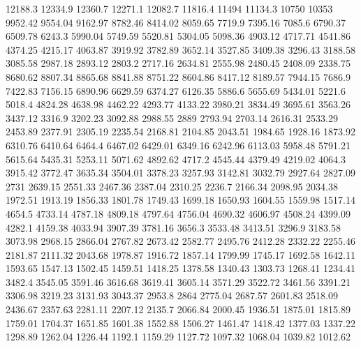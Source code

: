 12188.3      12334.9      12360.7      12271.1      12082.7      11816.4      11494      11134.3      10750      10353      9952.42      9554.04      9162.97      8782.46      8414.02      8059.65      7719.9      7395.16      7085.6      6790.37      6509.78      6243.3      5990.04      5749.59      5520.81      5304.05      5098.36      4903.12      4717.71      4541.86      4374.25      4215.17      4063.87      3919.92      3782.89      3652.14      3527.85      3409.38      3296.43      3188.58      3085.58      2987.18      2893.12      2803.2      2717.16      2634.81      2555.98      2480.45      2408.09      2338.75      
8680.62      8807.34      8865.68      8841.88      8751.22      8604.86      8417.12      8189.57      7944.15      7686.9      7422.83      7156.15      6890.96      6629.59      6374.27      6126.35      5886.6      5655.69      5434.01      5221.6      5018.4      4824.28      4638.98      4462.22      4293.77      4133.22      3980.21      3834.49      3695.61      3563.26      3437.12      3316.9      3202.23      3092.88      2988.55      2889      2793.94      2703.14      2616.31      2533.29      2453.89      2377.91      2305.19      2235.54      2168.81      2104.85      2043.51      1984.65      1928.16      1873.92      
6310.76      6410.64      6464.4      6467.02      6429.01      6349.16      6242.96      6113.03      5958.48      5791.21      5615.64      5435.31      5253.11      5071.62      4892.62      4717.2      4545.44      4379.49      4219.02      4064.3      3915.42      3772.47      3635.34      3504.01      3378.23      3257.93      3142.81      3032.79      2927.64      2827.09      2731      2639.15      2551.33      2467.36      2387.04      2310.25      2236.7      2166.34      2098.95      2034.38      1972.51      1913.19      1856.33      1801.78      1749.43      1699.18      1650.93      1604.55      1559.98      1517.14      
4654.5      4733.14      4787.18      4809.18      4797.64      4756.04      4690.32      4606.97      4508.24      4399.09      4282.1      4159.38      4033.94      3907.39      3781.16      3656.3      3533.48      3413.51      3296.9      3183.58      3073.98      2968.15      2866.04      2767.82      2673.42      2582.77      2495.76      2412.28      2332.22      2255.46      2181.87      2111.32      2043.68      1978.87      1916.72      1857.14      1799.99      1745.17      1692.58      1642.11      1593.65      1547.13      1502.45      1459.51      1418.25      1378.58      1340.43      1303.73      1268.41      1234.41      
3482.4      3545.05      3591.46      3616.68      3619.41      3605.14      3571.29      3522.72      3461.56      3391.21      3306.98      3219.23      3131.93      3043.37      2953.8      2864      2775.04      2687.57      2601.83      2518.09      2436.67      2357.63      2281.11      2207.12      2135.7      2066.84      2000.45      1936.51      1875.01      1815.89      1759.01      1704.37      1651.85      1601.38      1552.88      1506.27      1461.47      1418.42      1377.03      1337.22      1298.89      1262.04      1226.44      1192.1      1159.29      1127.72      1097.32      1068.04      1039.82      1012.62      
